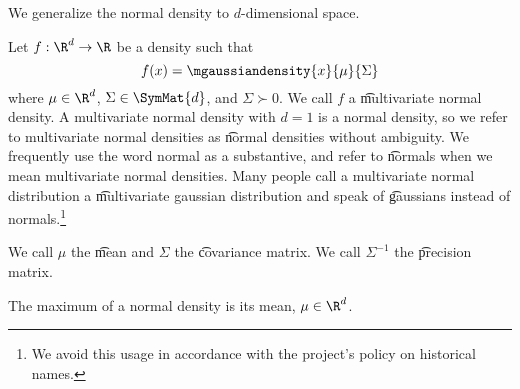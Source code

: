 

We generalize the normal density
to $d$-dimensional space.


Let $f: \R^d \to \R$ be a density such that $$f(x) = \mgaussiandensity{x}{\mu}{\Sigma}$$ where $\mu \in \R^d$, $\Sigma \in \SymMat{d}$, and $\Sigma \succ 0$.
We call $f$ a \t{multivariate normal density}.
A multivariate normal density with $d = 1$ is a normal density, so we refer to multivariate normal densities as \t{normal densities} without ambiguity.
We frequently use the word normal as a substantive, and refer to \t{normals} when we mean multivariate normal densities.
Many people call a multivariate normal distribution a \t{multivariate gaussian distribution} and speak of \t{gaussians} instead of normals.\footnote{We avoid this usage in accordance with the project's policy on historical names.}

We call $\mu$ the \t{mean} and $\Sigma$ the \t{covariance matrix}.
We call $\Sigma^{-1}$ the \t{precision matrix}.


The maximum of a normal density is its mean, $\mu \in \R^d$.

\blankpage
